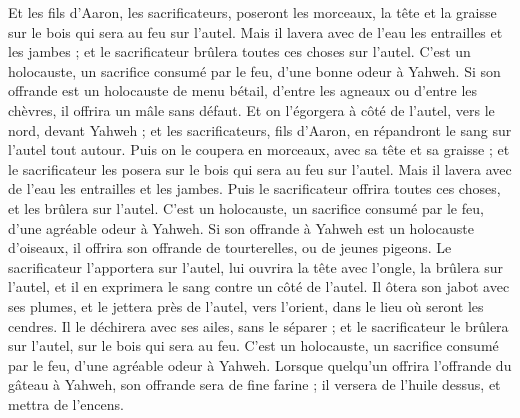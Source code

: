 \begin{multicols}{2}
Et les fils d'Aaron, les sacrificateurs, poseront les morceaux, la tête et la graisse sur le bois qui sera au feu sur l'autel.
Mais il lavera avec de l'eau les entrailles et les jambes ; et le sacrificateur brûlera toutes ces choses sur l'autel. C'est un holocauste, un sacrifice consumé par le feu, d'une bonne odeur à Yahweh.
Si son offrande est un holocauste de menu bétail, d'entre les agneaux ou d'entre les chèvres, il offrira un mâle sans défaut.
Et on l'égorgera à côté de l'autel, vers le nord, devant Yahweh ; et les sacrificateurs, fils d'Aaron, en répandront le sang sur l'autel tout autour.
Puis on le coupera en morceaux, avec sa tête et sa graisse ; et le sacrificateur les posera sur le bois qui sera au feu sur l'autel.
Mais il lavera avec de l'eau les entrailles et les jambes. Puis le sacrificateur offrira toutes ces choses, et les brûlera sur l'autel. C'est un holocauste, un sacrifice consumé par le feu, d'une agréable odeur à Yahweh.
Si son offrande à Yahweh est un holocauste d'oiseaux, il offrira son offrande de tourterelles, ou de jeunes pigeons.
Le sacrificateur l'apportera sur l'autel, lui ouvrira la tête avec l'ongle, la brûlera sur l'autel, et il en exprimera le sang contre un côté de l'autel.
Il ôtera son jabot avec ses plumes, et le jettera près de l'autel, vers l'orient, dans le lieu où seront les cendres.
Il le déchirera avec ses ailes, sans le séparer ; et le sacrificateur le brûlera sur l'autel, sur le bois qui sera au feu. C'est un holocauste, un sacrifice consumé par le feu, d'une agréable odeur à Yahweh.
\VerseOne{}Lorsque quelqu'un offrira l'offrande du gâteau à Yahweh, son offrande sera de fine farine ; il versera de l'huile dessus, et mettra de l'encens.

\end{multicols}

